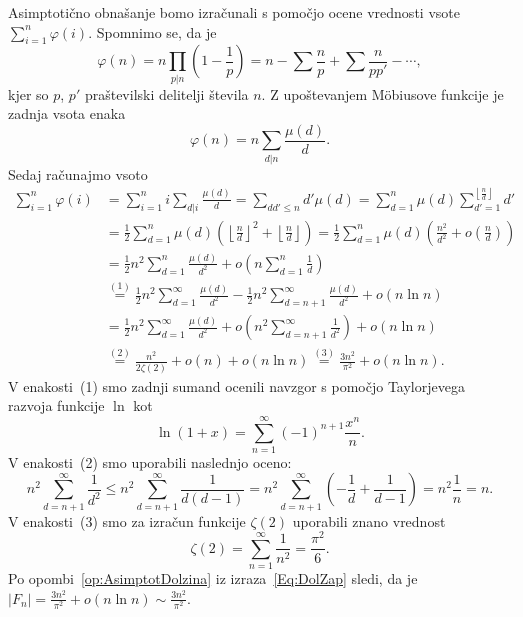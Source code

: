 \documentclass[mat1]{fmfdelo}
\begin{document}
\begin{dokaz}
Asimptotično obnašanje bomo izračunali s pomočjo ocene vrednosti vsote \( \sum_{i=1}^n \varphi(i) \).
Spomnimo se, da je 
\[ \varphi(n) = n \prod_{p|n} \left (1 - \frac{1}{p} \right ) = n - \sum \frac{n}{p} + \sum \frac{n}{pp'} - \cdots , \]
kjer so $p$, $p'$ praštevilski delitelji števila $n$.  Z upoštevanjem M\"obiusove funkcije je zadnja vsota enaka
\[ \varphi(n) = n \sum_{d|n} \frac{\mu(d)}{d} .\]
Sedaj računajmo vsoto 
%
\begin{align}
\label{Eq:DolZap}
\sum_{i=1}^n \varphi(i)
  &= \sum_{i=1}^n i \sum_{d|i} \frac{\mu(d)}{d} = \sum_{dd'\leq n}d' \mu(d) = 
    \sum_{d=1}^n \mu(d) \sum_{d'=1}^{\left \lfloor \frac{n}{d} \right \rfloor} d' \nonumber \\
  &= \frac{1}{2} \sum_{d=1}^{n} \mu(d) \left (\left \lfloor \frac{n}{d} \right \rfloor ^2 + \left \lfloor \frac{n}{d} \right \rfloor \right) =
    \frac{1}{2} \sum_{d=1}^{n} \mu(d) \left (\frac{n^2}{d^2} + o \left (\frac{n}{d} \right) \right) \nonumber \\
  &= \frac{1}{2}n^2 \sum_{d=1}^{n} \frac{\mu(d)}{d^2} + o \left (n \sum_{d=1}^{n} \frac{1}{d} \right ) \nonumber \\
  &\stackrel{(1)}{=} \frac{1}{2}n^2 \sum_{d=1}^{\infty} \frac{\mu(d)}{d^2} - \frac{1}{2}n^2 \sum_{d=n+1}^{\infty} \frac{\mu(d)}{d^2} + o(n \ln{n}) \nonumber \\
  &= \frac{1}{2}n^2 \sum_{d=1}^{\infty} \frac{\mu(d)}{d^2} + o \left (n^2\sum_{d=n+1}^{\infty} \frac{1}{d^2} \right ) + o(n \ln{n}) \nonumber \\
  & \stackrel{(2)}{=} \frac{n^2}{2 \zeta(2)} + o(n) + o(n \ln{n}) \stackrel{(3)}{=} \frac{3n^2}{\pi^2} + o(n \ln{n}).
\end{align}
%
V enakosti~(1) smo zadnji sumand ocenili navzgor s pomočjo Taylorjevega razvoja funkcije $\ln$ kot
\[ \ln{(1+x)} = \sum_{n=1}^{\infty} (-1)^{n+1} \frac{x^n}{n}.\]
%
V enakosti~(2) smo uporabili naslednjo oceno:
\[ n^2 \sum_{d=n+1}^{\infty} \frac{1}{d^2} \leq n^2 \sum_{d=n+1}^{\infty} \frac{1}{d(d-1)} = 
n^2 \sum_{d=n+1}^{\infty} \left (- \frac{1}{d} + \frac{1}{d-1} \right ) = n^2 \frac{1}{n} = n.\]
%
V enakosti~(3) smo za izračun funkcije $\zeta(2)$ uporabili znano vrednost
\[ \zeta(2) = \sum_{n=1}^{\infty} \frac{1}{n^2} = \frac{\pi^2}{6}.\]
%
Po opombi~\ref{op:AsimptotDolzina} iz izraza~\eqref{Eq:DolZap} sledi, da je \(|F_n| = \frac{3n^2}{\pi^2} + o(n \ln{n}) \sim\frac{3n^2}{\pi^2}. \)
\end{dokaz}

%
\end{document}
